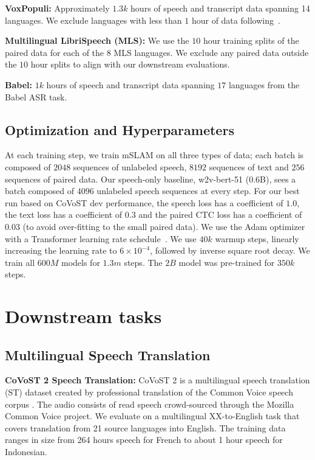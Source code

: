 \documentclass[nohyperref]{article}
\newcommand{\wvbert}{w2v-bert-51 (0.6B)}
\newcommand{\mslam}{mSLAM}
\begin{document}
\textbf{VoxPopuli:} Approximately $1.3k$ hours of speech and transcript data spanning 14 languages. We exclude languages with less than $1$ hour of data following~\citet{wang2021voxpopuli}.

\textbf{Multilingual LibriSpeech (MLS):} We use the $10$ hour training splits of the paired data for each of the $8$ MLS languages. We exclude any paired data outside the $10$ hour splits to align with our downstream evaluations.

\textbf{Babel:} $1k$ hours of speech and transcript data spanning $17$ languages from the Babel ASR task.

\subsection{Optimization and Hyperparameters}
\label{subsec:pretrain-opt}
At each training step, we train \mslam{} on all three types of data; each batch is composed of $2048$ sequences of unlabeled speech, $8192$ sequences of text and $256$ sequences of paired data. Our speech-only baseline, \wvbert, sees a batch composed of $4096$ unlabeled speech sequences at every step. For our best run based on CoVoST dev performance, the speech loss has a coefficient of $1.0$, the text loss has a coefficient of $0.3$ and the paired CTC loss has a coefficient of $0.03$ (to avoid over-fitting to the small paired data). We use the Adam optimizer~\citep{kingma2014adam} with a Transformer learning rate schedule~\citep{vaswani2017attention}. We use $40k$ warmup steps, linearly increasing the learning rate to $6\times10^{-4}$, followed by inverse square root decay. We train all $600M$ models for $1.3m$ steps. The $2B$ model was pre-trained for $350k$ steps.

\section{Downstream tasks}
\label{sec:tasks}

\subsection{Multilingual Speech Translation}
\label{subsec:tasks-ast}
\textbf{CoVoST 2 Speech Translation:} CoVoST 2 \cite{wang2020covost} is a multilingual speech translation (ST) dataset created by professional translation of the Common Voice speech corpus \citep{ardila2020common}. The audio consists of read speech crowd-sourced through the Mozilla Common Voice project. We evaluate on a multilingual XX-to-English task that covers translation from 21 source languages into English. The training data ranges in size from 264 hours speech for French to about 1 hour speech for Indonesian. 
\end{document}

